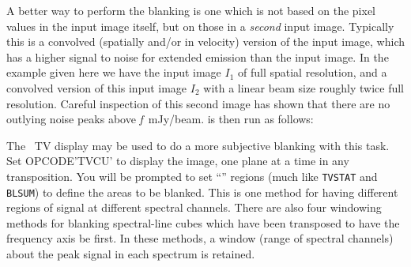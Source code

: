 A better way to perform the blanking is one which is not based on the
pixel values in the input image itself, but on those in a {\it
second\/} input image. Typically this is a convolved (spatially and/or
in velocity) version of the input image, which has a higher signal to
noise for extended emission than the input image. In the example given
here we have the input image $I_1$ of full spatial resolution, and a
convolved version of this input image $I_2$ with a linear beam size
roughly twice full resolution. Careful inspection of this second image
has shown that there are no outlying noise peaks above {\it f}~mJy/beam.
{\tt {}} is then run as follows:

     The \AIPS\ TV display may be used to do a more subjective
blanking with this task.  Set {\us OPCODE\qs 'TVCU' \CR} to display
the image, one plane at a time in any transposition.  You will be
prompted to set ``'' regions (much like {\tt TVSTAT} and
{\tt BLSUM}) to define the areas to be blanked.  This is one method
for having different regions of signal at different spectral channels.
There are also four windowing methods for blanking spectral-line cubes
which have been transposed to have the frequency axis be first.  In
these methods, a window (range of spectral channels) about the peak
signal in each spectrum is retained.


